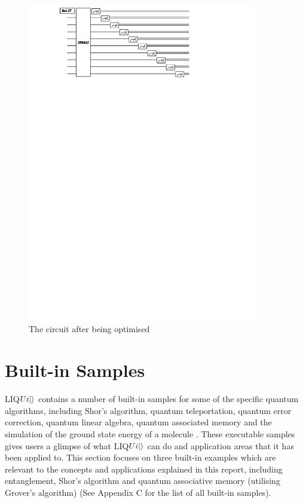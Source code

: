 \documentclass[12pt]{third-rep}
\begin{document}
\begin{figure}[ht]
\centering
\includegraphics[width=10cm]{circuit2}
\caption{The circuit after being optimised}
\end{figure}

\newpage
\section{Built-in Samples}
LIQ$Ui{\left\vert{}\right\rangle}$ contains a number of built-in samples for some of the specific quantum algorithms, including Shor’s algorithm, quantum teleportation, quantum error correction, quantum linear algebra, quantum associated memory and the simulation of the ground state energy of a molecule \cite{liquid-manual}. These executable samples gives users a glimpse of what LIQ$Ui{\left\vert{}\right\rangle}$ can do and application areas that it has been applied to. This section focuses on three built-in examples which are relevant to the concepts and applications explained in this report, including entanglement, Shor’s algorithm and quantum associative memory (utilising Grover’s algorithm) (See Appendix C for the list of all built-in samples).
\end{document}
